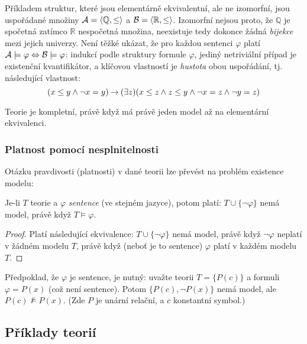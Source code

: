 \begin{example}
    Příkladem struktur, které jsou elementárně ekvivalentní, ale ne izomorfní, jsou uspořádané množiny $\mathcal{A}=\langle\mathbb Q,\leq\rangle$ a $\mathcal{B}=\langle\mathbb R,\leq\rangle$. Izomorfní nejsou proto, že $\mathbb Q$ je spočetná zatímco $\mathbb R$ nespočetná množina, neexistuje tedy dokonce žádná \emph{bijekce} mezi jejich univerzy. Není těžké ukázat, že pro každou sentenci $\varphi$ platí $\mathcal{A}\models\varphi\Leftrightarrow\mathcal{B}\models\varphi$: indukcí podle struktury formule $\varphi$, jediný netriviální případ je existenční kvantifikátor, a klíčovou vlastností je \emph{hustota} obou uspořádání, tj. následující vlastnost:
    $$
    (x\leq y\land \neg x=y)\mathbin{\rightarrow}(\exists z)(x\leq z\land z\leq y\land \neg x=z\land\neg y=z)
    $$

\end{example}
\begin{observation}
    Teorie je kompletní, právě když má právě jeden model až na elementární ekvivalenci.    
\end{observation}



\subsubsection{Platnost pomocí nesplnitelnosti}

Otázku pravdivosti (platnosti) v dané teorii lze převést na problém existence modelu:
\begin{proposition}
    Je-li $T$ teorie a $\varphi$ \emph{sentence} (ve stejném jazyce), potom platí: $T\cup\{\neg\varphi\}$ nemá model, právě když $T\models\varphi$.
\end{proposition}
\begin{proof}
    Platí následující ekvivalence: $T\cup\{\neg\varphi\}$ nemá model, právě když $\neg\varphi$ neplatí v žádném modelu $T$, právě když (neboť je to sentence) $\varphi$ platí v každém modelu $T$. 
\end{proof}

Předpoklad, že $\varphi$ je sentence, je nutný: uvažte teorii $T=\{P(c)\}$ a formuli $\varphi=P(x)$ (což není sentence). Potom $\{P(c),\neg P(x)\}$ nemá model, ale $P(c)\not\models P(x)$. (Zde $P$ je unární relační, a $c$ konstantní symbol.)


\subsection{Příklady teorií}

